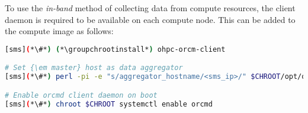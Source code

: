 To use the {\em in-band} method of collecting data from compute resources, the
\ORCM{} client daemon is required to be available on each compute node. This can
be added to the compute image as follows:

\begin{lstlisting}[language=bash,keywords={},upquote=true]
[sms](*\#*) (*\groupchrootinstall*) ohpc-orcm-client

# Set {\em master} host as data aggregator
[sms](*\#*) perl -pi -e "s/aggregator_hostname/<sms_ip>/" $CHROOT/opt/open-rcm/etc/orcm-site.xml

# Enable orcmd client daemon on boot
[sms](*\#*) chroot $CHROOT systemctl enable orcmd
\end{lstlisting}
